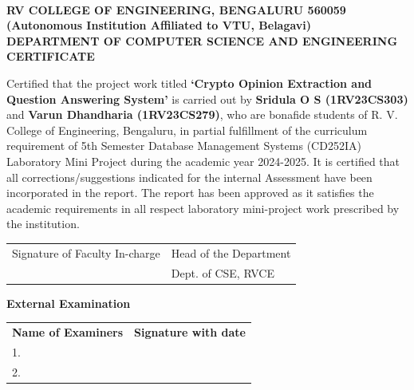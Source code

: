 
\newpage
\thispagestyle{empty}

\begin{center}
\textbf{\Large RV COLLEGE OF ENGINEERING\textsuperscript{\textregistered}, BENGALURU 560059}\\[0.3cm]
\textbf{(Autonomous Institution Affiliated to VTU, Belagavi)}\\[0.3cm]
\textbf{DEPARTMENT OF COMPUTER SCIENCE AND ENGINEERING}\\[1.5cm]

\textbf{\Large CERTIFICATE}\\[1cm]
\end{center}

\noindent Certified that the project work titled \textbf{`Crypto Opinion Extraction and Question Answering System'} is carried out by \textbf{Sridula O S (1RV23CS303)} and \textbf{Varun Dhandharia (1RV23CS279)}, who are bonafide students of R. V. College of Engineering, Bengaluru, in partial fulfillment of the curriculum requirement of 5th Semester Database Management Systems (CD252IA) Laboratory Mini Project during the academic year 2024-2025. It is certified that all corrections/suggestions indicated for the internal Assessment have been incorporated in the report. The report has been approved as it satisfies the academic requirements in all respect laboratory mini-project work prescribed by the institution.

\vspace{2cm}

\noindent\begin{tabular}{@{}p{}p{}@{}}
Signature of Faculty In-charge & Head of the Department \\
& Dept. of CSE, RVCE
\end{tabular}

\vspace{2cm}

\noindent\textbf{External Examination}\\[0.5cm]
\begin{tabular}{@{}p{}p{}@{}}
\textbf{Name of Examiners} & \textbf{Signature with date}\\[0.5cm]
1. & \\[0.5cm]
2. & 
\end{tabular}
